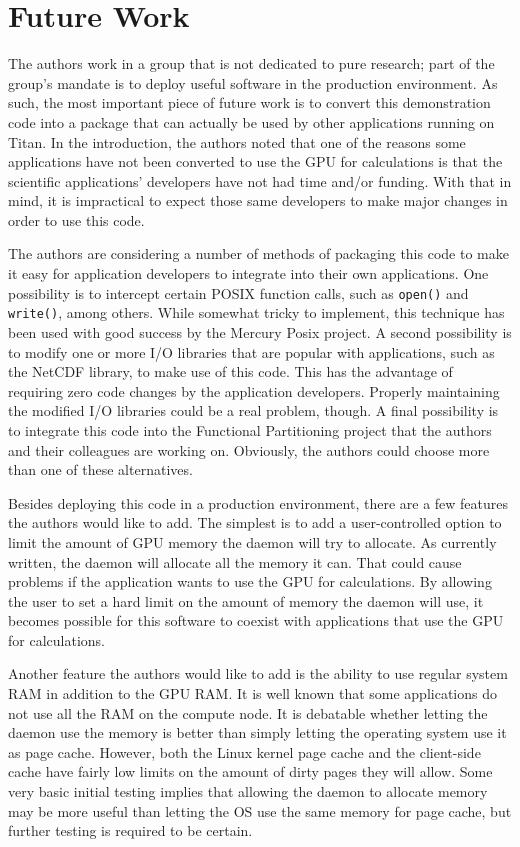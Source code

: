 \section{Future Work}
\label{sec:future}

The authors work in a group that is not dedicated to pure research; part of the group's mandate is to deploy useful software in the production environment.  As such, the most important piece of future work is to convert this demonstration code into a package that can actually be used by other applications running on Titan.  In the introduction, the authors noted that one of the reasons some applications have not been converted to use the GPU for calculations is that the scientific applications' developers have not had time and/or funding.  With that in mind, it is impractical to expect those same developers to make major changes in order to use this code.  

The authors are considering a number of methods of packaging this code to make it easy for application developers to integrate into their own applications.  One possibility is to intercept certain POSIX function calls, such as \texttt{open()} and \texttt{write()}, among others.  While somewhat tricky to implement, this technique has been used with good success by the Mercury Posix project.\cite{mercury_posix_demo}  A second possibility is to modify one or more I/O libraries that are popular with applications, such as the NetCDF library, to make use of this code.  This has the advantage of requiring zero code changes by the application developers.  Properly maintaining the modified I/O libraries could be a real problem, though. A final possibility is to integrate this code into the Functional Partitioning project that the authors and their colleagues are working on.\cite{Li:2010:FPO:1884643.1884686}  Obviously, the authors could choose more than one of these alternatives.


Besides deploying this code in a production environment, there are a few features the authors would like to add.  The simplest is to add a user-controlled option to limit the amount of GPU memory the daemon will try to allocate.  As currently written, the daemon will allocate all the memory it can.  That could cause problems if the application wants to use the GPU for calculations.  By allowing the user to set a hard limit on the amount of memory the daemon will use, it becomes possible for this software to coexist with applications that use the GPU for calculations.

Another feature the authors would like to add is the ability to use regular system RAM in addition to the GPU RAM.  It is well known that some applications do not use all the RAM on the compute node.  It is debatable whether letting the daemon use the memory is better than simply letting the operating system use it as page cache.  However, both the Linux kernel page cache and the client-side cache have fairly low limits on the amount of dirty pages they will allow.  Some very basic initial testing implies that allowing the daemon to allocate memory may be more useful than letting the OS use the same memory for page cache, but further testing is required to be certain.

